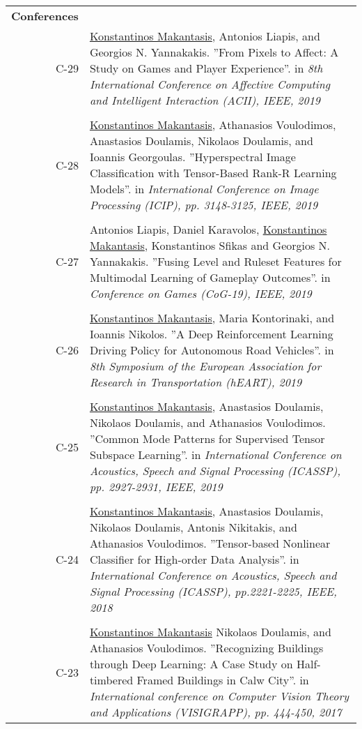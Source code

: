 \documentclass[a4paper,10pt]{article}
\begin{document}
\begin{longtable}{r p{11cm}}
 
\textbf{Conferences} &  \\
C-29 &\small{\underline{Konstantinos Makantasis}, Antonios Liapis, and Georgios N. Yannakakis. ''From Pixels to Affect: A Study on Games and Player Experience''. in \textit{8th International Conference on Affective Computing and Intelligent Interaction (ACII), IEEE, 2019}}\\
\multicolumn{2}{c}{} \\
C-28 &\small{\underline{Konstantinos Makantasis}, Athanasios Voulodimos, Anastasios Doulamis, Nikolaos Doulamis, and Ioannis Georgoulas. ''Hyperspectral Image Classification with Tensor-Based Rank-R Learning Models''. in \textit{International Conference on Image Processing (ICIP), pp. 3148-3125, IEEE, 2019}}\\
\multicolumn{2}{c}{} \\
C-27 &\small{Antonios Liapis, Daniel Karavolos, \underline{Konstantinos Makantasis}, Konstantinos Sfikas and Georgios N. Yannakakis. ''Fusing Level and Ruleset Features for Multimodal Learning of Gameplay Outcomes''. in \textit{Conference on Games (CoG-19), IEEE, 2019}}\\
\multicolumn{2}{c}{} \\
C-26 &\small{\underline{Konstantinos Makantasis}, Maria Kontorinaki, and Ioannis Nikolos. ''A Deep Reinforcement Learning Driving Policy for Autonomous Road Vehicles''. in \textit{8th Symposium of the European Association for Research in Transportation (hEART), 2019}}\\
\multicolumn{2}{c}{} \\
C-25 &\small{\underline{Konstantinos Makantasis}, Anastasios Doulamis, Nikolaos Doulamis, and Athanasios Voulodimos. ''Common Mode Patterns for Supervised Tensor Subspace Learning''. in \textit{International Conference on Acoustics, Speech and Signal Processing (ICASSP), pp. 2927-2931, IEEE, 2019}}\\
\multicolumn{2}{c}{} \\
C-24 &\small{\underline{Konstantinos Makantasis}, Anastasios Doulamis, Nikolaos Doulamis, Antonis Nikitakis, and Athanasios Voulodimos. ''Tensor-based Nonlinear Classifier for High-order Data Analysis''. in \textit{International Conference on Acoustics, Speech and Signal Processing (ICASSP), pp.2221-2225, IEEE, 2018}}\\
 \multicolumn{2}{c}{} \\
C-23 &\small{\underline{Konstantinos Makantasis} Nikolaos Doulamis, and Athanasios Voulodimos. ''Recognizing Buildings through Deep Learning: A Case Study on Half-timbered Framed Buildings in Calw City''. in \textit{International conference on Computer Vision Theory and Applications (VISIGRAPP), pp. 444-450, 2017}}\\

\end{longtable}
\end{document}
